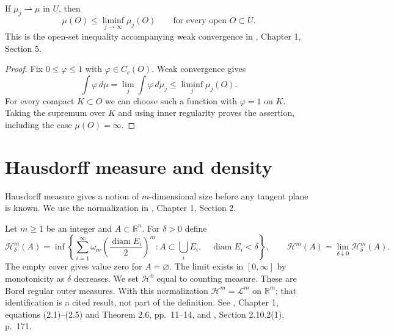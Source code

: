 \begin{proposition}\label{prop:measure-lsc}
If $\mu_j\rightharpoonup\mu$ in $U$, then
\[
 \mu(O)\leq\liminf_{j\to\infty}\mu_j(O)
 \qquad\text{for every open }O\subset U.
\]
This is the open-set inequality accompanying weak convergence in \cite{Sim18}, Chapter 1, Section 5.
\end{proposition}
\begin{proof}
Fix $0\leq\varphi\leq1$ with $\varphi\in C_c(O)$. Weak convergence gives
\[
 \int\varphi\,d\mu=\lim_j\int\varphi\,d\mu_j\leq\liminf_j\mu_j(O).
\]
For every compact $K\subset O$ we can choose such a function with $\varphi=1$ on $K$. Taking the supremum over $K$ and using inner regularity proves the assertion, including the case $\mu(O)=\infty$.
\end{proof}

\chapter{Hausdorff measure and density}\label{sec:hausdorff-measure}
Hausdorff measure gives a notion of $m$-dimensional size before any tangent plane is known. We use the normalization in \cite{Sim18}, Chapter 1, Section 2.

\begin{definition}\label{def:hausdorff-measure}
Let $m\geq1$ be an integer and $A\subset\mathbb{R}^n$. For $\delta>0$ define
\[
 \mathcal{H}^m_\delta(A)=\inf\left\{
 \sum_{i=1}^{\infty}\omega_m\left(\frac{\operatorname{diam}E_i}{2}\right)^m:
 A\subset\bigcup_iE_i,\quad\operatorname{diam}E_i<\delta\right\},
 \qquad
 \mathcal{H}^m(A)=\lim_{\delta\downarrow0}\mathcal{H}^m_\delta(A).
\]
The empty cover gives value zero for $A=\varnothing$. The limit exists in $[0,\infty]$ by monotonicity as $\delta$ decreases. We set $\mathcal{H}^0$ equal to counting measure. These are Borel regular outer measures. With this normalization $\mathcal{H}^m=\mathcal{L}^m$ on $\mathbb{R}^m$; that identification is a cited result, not part of the definition. See \cite{Sim18}, Chapter 1, equations (2.1)--(2.5) and Theorem 2.6, pp.~11--14, and \cite{Fed69}, Section 2.10.2(1), p.~171.
\end{definition}

